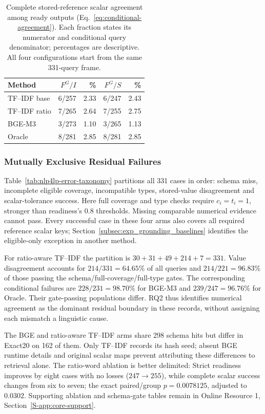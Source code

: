 \documentclass[pdflatex,iicol,sn-basic,Numbered]{sn-jnl}
\begin{document}
\begin{table}[t]\centering\small
\caption{Complete stored-reference scalar agreement among ready outputs (Eq.~\eqref{eq:conditional-agreement}). Each fraction states its numerator and conditional query denominator; percentages are descriptive. All four configurations start from the same 331-query frame.}
\label{tab:ready-conditioned}
\setlength{\tabcolsep}{2.2pt}
\begin{tabular}{@{}lrrrr@{}}\toprule
Method & $F^G/I$ & \% & $F^G/S$ & \%\\\midrule
TF--IDF base & 6/257 & 2.33 & 6/247 & 2.43 \\
TF--IDF ratio & 7/265 & 2.64 & 7/255 & 2.75 \\
BGE-M3 & 3/273 & 1.10 & 3/265 & 1.13 \\
Oracle & 8/281 & 2.85 & 8/281 & 2.85 \\
\bottomrule\end{tabular}
\end{table}

\subsubsection{Mutually Exclusive Residual Failures}
\label{subsec:exp_error}
Table~\ref{tab:nlp4lp-error-taxonomy} partitions all 331 cases in order: schema miss, incomplete eligible coverage, incompatible types, stored-value disagreement and scalar-tolerance success. Here full coverage and type checks require $c_i=t_i=1$, stronger than readiness's 0.8 thresholds. Missing comparable numerical evidence cannot pass. Every successful case in these four arms also covers all required reference scalar keys; Section~\ref{subsec:exp_grounding_baselines} identifies the eligible-only exception in another method.

For ratio-aware TF--IDF the partition is $30+31+49+214+7=331$. Value disagreement accounts for $214/331=64.65\%$ of all queries and $214/221=96.83\%$ of those passing the schema/full-coverage/full-type gates. The corresponding conditional failures are $228/231=98.70\%$ for BGE-M3 and $239/247=96.76\%$ for Oracle. Their gate-passing populations differ. RQ2 thus identifies numerical agreement as the dominant residual boundary in these records, without assigning each mismatch a linguistic cause.

The BGE and ratio-aware TF--IDF arms share 298 schema hits but differ in Exact20 on 162 of them. Only TF--IDF records its hash seed; absent BGE runtime details and original scalar maps prevent attributing these differences to retrieval alone. The ratio-word ablation is better delimited: Strict readiness improves by eight cases with no losses ($247\to255$), while complete scalar success changes from six to seven; the exact paired/group $p=0.0078125$, adjusted to $0.0302$. Supporting ablation and schema-gate tables remain in Online Resource 1, Section~\ref{S-app:core-support}.
\end{document}
